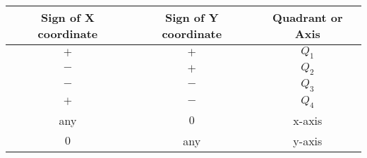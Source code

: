 \begin{tabular}[12pt]{ |c| c| c|} 
    \hline
    {Sign of X coordinate} & {Sign of Y coordinate} & {Quadrant or Axis}\\ 
    \hline
    $ + $ & $ + $ & $ Q_1 $\\
    \hline 
    $ - $ & $ + $ & $ Q_2 $ \\
    \hline
    $ - $ & $ - $ & $ Q_3 $ \\
    \hline   
    $ + $ & $ - $ & $ Q_4 $\\
    \hline
    any  & $ 0 $ & x-axis\\
    \hline
    $ 0 $ &  any  & y-axis\\
    \hline
    \end{tabular}
